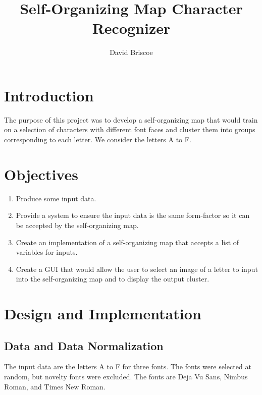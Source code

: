 \documentclass[12pt,letterpaper,oneside]{report}
\title{Self-Organizing Map Character Recognizer}
\author{ David Briscoe }
\begin{document}
\setcounter{page}{1}
\maketitle
\tableofcontents
\clearpage

\setcounter{section}{0}
\setcounter{page}{1}

\doublespacing


\section{Introduction}
The purpose of this project was to develop a self-organizing map that would train on a selection of characters with different font faces and cluster them into groups corresponding to each letter. We consider the letters A to F.

\section{Objectives}

\begin{enumerate}
\item Produce some input data.
\item Provide a system to ensure the input data is the same form-factor so it can be accepted by the self-organizing map.
\item Create an implementation of a self-organizing map that accepts a list of variables for inputs.
\item Create a GUI that would allow the user to select an image of a letter to input into the self-organizing map and to display the output cluster.
\end{enumerate}

\clearpage
\section{Design and Implementation}
\subsection{Data and Data Normalization}
The input data are the letters A to F for three fonts. The fonts were selected at random, but novelty fonts were excluded. The fonts are Deja Vu Sans, Nimbus Roman, and Times New Roman. 
\end{document}
